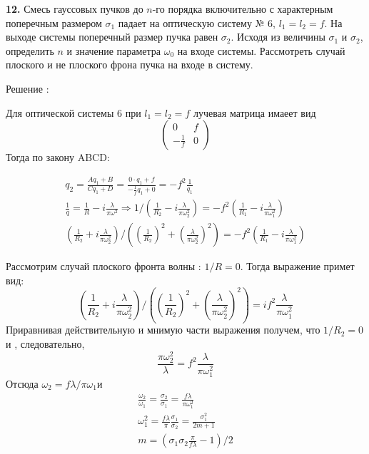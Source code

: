 \documentclass[a4paper,12pt]{article}
\begin{document}
\textbf{12.} Смесь гауссовых пучков до $n$-го порядка включительно с характерным поперечным размером $\sigma_1$ падает на оптическую систему № 6, $l_1 = l_2 = f$. На выходе системы поперечный размер пучка равен $\sigma_2$. Исходя из величины $\sigma_1$ и $\sigma_2$, определить $n$ и значение параметра $\omega_0$ на входе системы. Рассмотреть случай плоского и не плоского фрона пучка на входе в систему.

Решение : 

Для оптической системы 6 при $l_1 = l_2 = f  $ лучевая матрица имаеет вид
\[
\begin{pmatrix}
       0 & f\\
       - \frac{1}{f} & 0
\end{pmatrix}
\]
Тогда по закону ABCD:

\begin{gather*}
     q_2 = \frac{A q_1 + B}{C q_1 + D} = \frac{0 \cdot q_1 + f}{ -\frac{1}{f} q_1 + 0} = - f^ 2 \frac{1}{q_1}\\
     \frac{1}{q} = \frac{1}{R} - i\frac{\lambda}{\pi \omega^ 2} \Rightarrow 1/ \left(\frac{1}{R_2} - i \frac{\lambda}{\pi \omega_2^2} \right)  = - f^2 \left( \frac{1}{R_1} - i \frac{\lambda}{\pi\omega_1 ^ 2} \right)\\
    \left(\frac{1}{R_2}  + i \frac{\lambda}{\pi \omega_2^2} \right)/ \left( \left(\frac{1}{R_2}\right) ^ 2 + \left( \frac{\lambda}{\pi \omega_2^2}\right)^ 2  \right) = - f^2 \left( \frac{1}{R_1} - i \frac{\lambda}{\pi\omega_1 ^ 2} \right)
\end{gather*}

Рассмотрим случай плоского фронта волны : $1/R = 0$. Тогда выражение примет вид:
\begin{equation*}
     \left(\frac{1}{R_2}  + i \frac{\lambda}{\pi \omega_2^2} \right)/ \left( \left(\frac{1}{R_2}\right) ^ 2 + \left( \frac{\lambda}{\pi \omega_2^2}\right)^ 2  \right) =  i f^2\frac{\lambda}{\pi\omega_1 ^ 2} 
\end{equation*}
Приравнивая действительную и мнимую части выражения получем, что $1/R_2 = 0 $ и , следовательно, 
\begin{equation*}
    \frac{\pi \omega_2^2} {\lambda }  = f^2 \frac{\lambda }{\pi \omega_1 ^ 2} 
\end{equation*}
Отсюда $\omega_2 = f\lambda / \pi \omega_1 $и 
\begin{gather*}
     \frac{\omega_2}{\omega_1} = \frac{\sigma_2}{\sigma_1} = \frac{f \lambda}{\pi\omega_1^2}\\
     \omega_1^2 = \frac{f \lambda}{\pi}\frac{\sigma_1}{\sigma_2} = \frac{\sigma_1 ^ 2}{2m + 1}\\
     m = \left(\sigma_1\sigma_2\frac{\pi}{f \lambda} - 1\right) / 2
\end{gather*}
   
\end{document}
